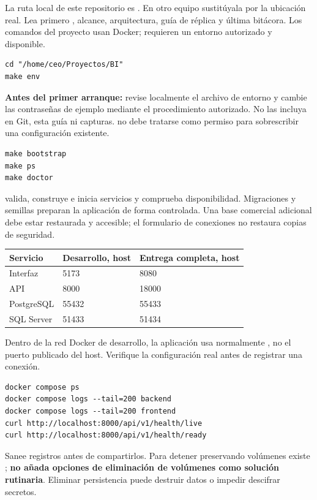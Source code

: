 La ruta local de este repositorio es . En otro equipo sustitúyala por la ubicación real. Lea primero , alcance, arquitectura, guía de réplica y última bitácora. Los comandos del proyecto usan Docker; requieren un entorno autorizado y disponible.
\begin{verbatim}
cd "/home/ceo/Proyectos/BI"
make env
\end{verbatim}
\textbf{Antes del primer arranque:} revise localmente el archivo de entorno y cambie las contraseñas de ejemplo mediante el procedimiento autorizado. No las incluya en Git, esta guía ni capturas.  no debe tratarse como permiso para sobrescribir una configuración existente.
\begin{verbatim}
make bootstrap
make ps
make doctor
\end{verbatim}
 valida, construye e inicia servicios y comprueba disponibilidad. Migraciones y semillas preparan la aplicación de forma controlada. Una base comercial adicional debe estar restaurada y accesible; el formulario de conexiones no restaura copias de seguridad.
\begin{tabularx}{\linewidth}{@{}Yp{42mm}p{42mm}@{}}
\toprule
\textbf{Servicio}&\textbf{Desarrollo, host}&\textbf{Entrega completa, host}\\
\midrule
Interfaz&5173&8080\\
API&8000&18000\\
PostgreSQL&55432&55433\\
SQL Server&51433&51434\\
\bottomrule
\end{tabularx}
Dentro de la red Docker de desarrollo, la aplicación usa normalmente , no el puerto publicado del host. Verifique la configuración real antes de registrar una conexión.
\begin{verbatim}
docker compose ps
docker compose logs --tail=200 backend
docker compose logs --tail=200 frontend
curl http://localhost:8000/api/v1/health/live
curl http://localhost:8000/api/v1/health/ready
\end{verbatim}
Sanee registros antes de compartirlos. Para detener preservando volúmenes existe ; \textbf{no añada opciones de eliminación de volúmenes como solución rutinaria}. Eliminar persistencia puede destruir datos o impedir descifrar secretos.

